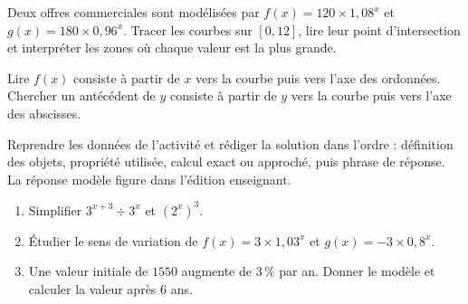 \begin{activite}
Deux offres commerciales sont modélisées par $f(x)=120\times1{,}08^x$ et $g(x)=180\times0{,}96^x$. Tracer les courbes sur $[0,12]$, lire leur point d'intersection et interpréter les zones où chaque valeur est la plus grande.
\begin{center}\end{center}
\end{activite}

\begin{traceecrite}Lire $f(x)$ consiste à partir de $x$ vers la courbe puis vers l'axe des ordonnées. Chercher un antécédent de $y$ consiste à partir de $y$ vers la courbe puis vers l'axe des abscisses.\end{traceecrite}

\begin{exemple}
Reprendre les données de l'activité et rédiger la solution dans l'ordre : définition des objets, propriété utilisée, calcul exact ou approché, puis phrase de réponse. La réponse modèle figure dans l'édition enseignant.
\end{exemple}

\begin{exercice}[-- essentiel]
\begin{enumerate}\item Simplifier $3^{x+3}\div3^x$ et $(2^x)^3$.\item Étudier le sens de variation de $f(x)=3\times1{,}03^x$ et $g(x)=-3\times0{,}8^x$.\item Une valeur initiale de $1550$ augmente de $3\,\%$ par an. Donner le modèle et calculer la valeur après $6$ ans.\end{enumerate}
\end{exercice}

